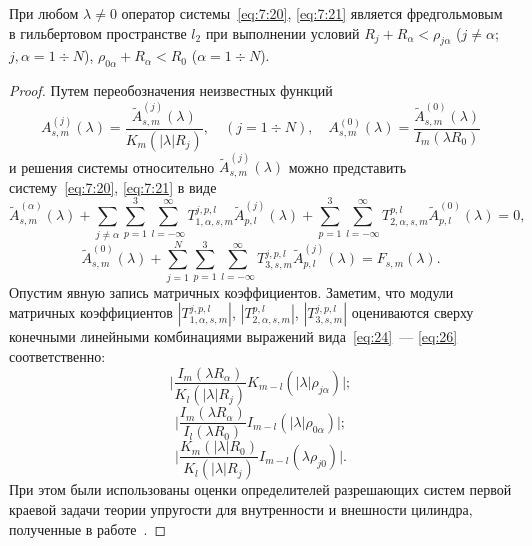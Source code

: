 \begin{theorem}
При любом $\lambda\neq 0$ оператор системы~\eqref{eq:7:20}, \eqref{eq:7:21} является фредгольмовым в гильбертовом пространстве $l_2$ при выполнении условий $R_j+R_\alpha<\rho_{j\alpha}$ ($j\neq\alpha$; $j,\alpha=1\div N$), $\rho_{0\alpha}+R_\alpha<R_0$ ($\alpha=1\div N$). 
\end{theorem}
\begin{proof}
Путем переобозначения неизвестных функций
\begin{equation}
A_{s,m}^{(j)}(\lambda)=\frac{\tilde A_{s,m}^{(j)}(\lambda)}{K_m(|\lambda|R_j)},\quad(j=1\div N),\quad A_{s,m}^{(0)}(\lambda)=\frac{\tilde A_{s,m}^{(0)}(\lambda)}{I_m(\lambda R_0)}
\end{equation}
и решения системы относительно $\tilde A_{s,m}^{(j)}(\lambda)$ можно представить систему~\eqref{eq:7:20}, \eqref{eq:7:21} в виде
\begin{equation}
\tilde A_{s,m}^{(\alpha)}(\lambda)+\sum\limits_{j\neq\alpha}\sum\limits_{p=1}^3\sum\limits_{l=-\infty}^\infty T_{1,\alpha,s,m}^{j,p,l}\tilde A_{p,l}^{(j)}(\lambda)+\sum\limits_{p=1}^3\sum\limits_{l=-\infty}^\infty T_{2,\alpha,s,m}^{p,l}\tilde A_{p,l}^{(0)}(\lambda)=0,
\label{eq:27}
\end{equation}
\begin{equation}
\tilde A_{s,m}^{(0)}(\lambda)+\sum\limits_{j=1}^N\sum\limits_{p=1}^3\sum\limits_{l=-\infty}^\infty T_{3,s,m}^{j,p,l}\tilde A_{p,l}^{(j)}(\lambda)=F_{s,m}(\lambda).
\label{eq:28}
\end{equation}
Опустим явную запись матричных коэффициентов. Заметим, что модули матричных коэффициентов $\left|T_{1,\alpha,s,m}^{j,p,l}\right|$, $\left|T_{2,\alpha,s,m}^{p,l}\right|$, $\left|T_{3,s,m}^{j,p,l}\right|$ оцениваются сверху конечными линейными комбинациями выражений вида~\eqref{eq:24}~--- \eqref{eq:26} соответственно:
\begin{equation}
\bigg|\frac{I_m(\lambda R_\alpha)}{K_l(|\lambda|R_j)}K_{m-l}(|\lambda|\rho_{j\alpha})\bigg|;
\label{eq:24}
\end{equation}
\begin{equation}
\bigg|\frac{I_m(\lambda R_\alpha)}{I_l(\lambda R_0)}I_{m-l}(|\lambda|\rho_{0\alpha})\bigg|;
\label{eq:25}
\end{equation}
\begin{equation}
\bigg|\frac{K_m(|\lambda|R_0)}{K_l(|\lambda|R_j)}I_{m-l}(\lambda\rho_{j0})\bigg|.
\label{eq:26}
\end{equation}
При этом были использованы оценки определителей разрешающих систем первой краевой задачи теории упругости для внутренности и внешности цилиндра, полученные в работе~\cite{Nikolaev1998}.


\end{proof}

